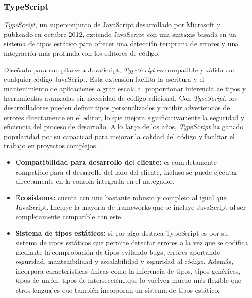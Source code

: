 \subsubsection{TypeScript}

\href{https://es.wikipedia.org/w/index.php?title=TypeScript&oldid=156203640}{\textit{TypeScript}}, un superconjunto de JavaScript desarrollado por Microsoft y publicado en octubre 2012, extiende JavaScript con una sintaxis basada en un sistema de tipos estático para ofrecer una detección temprana de errores y una integración más profunda con los editores de código.

Diseñado para compilarse a JavaScript, \textit{TypeScript} es compatible y válido con cualquier código JavaScript. Esta extensión facilita la escritura y el mantenimiento de aplicaciones a gran escala al proporcionar inferencia de tipos y herramientas avanzadas sin necesidad de código adicional. Con \textit{TypeScript}, los desarrolladores pueden definir tipos personalizados y recibir advertencias de errores directamente en el editor, lo que mejora significativamente la seguridad y eficiencia del proceso de desarrollo. A lo largo de los años, \textit{TypeScript} ha ganado popularidad por su capacidad para mejorar la calidad del código y facilitar el trabajo en proyectos complejos.

\begin{itemize}
    \item[\esp] \textbf{Compatibilidad para desarrollo del cliente:} es completamente compatible para el desarrollo del lado del cliente, incluso se puede ejecutar directamente en la consola integrada en el navegador.
    \item[\esp] \textbf{Ecosistema:} cuenta con uno bastante robusto y completo al igual que JavaScript. Incluye la mayoría de frameworks que se incluye JavaScript al ser completamente compatible con este.
    \item[\esp] \textbf{Sistema de tipos estáticos:} si por algo destaca TypeScript es por su sistema de tipos estáticos que permite detectar errores a la vez que se codifica mediante la comprobación de tipos evitando bugs, errores aportando seguridad, mantenibilidad y escalabilidad y seguridad al código. Además, incorpora características únicas como la inferencia de tipos, tipos genéricos, tipos de unión, tipos de intersección\ldots que lo vuelven mucho más flexible que otros lenguajes que también incorporan un sistema de tipos estático.
\end{itemize}

